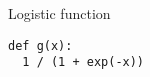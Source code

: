 \begin{frame}[fragile]
  \begin{block}{Logistic function}
    \begin{lstlisting}
def g(x):
  1 / (1 + exp(-x))
    \end{lstlisting}
  \end{block}
\end{frame}

